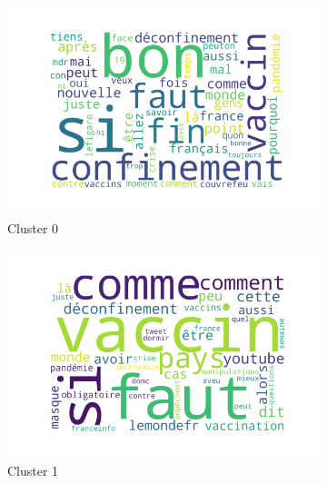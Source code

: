 \begin{figure}
    \centering
    \begin{subfigure}[b]{0.49\textwidth}
        \centering
        \includegraphics[width=\textwidth]{results/TopicDetection/fr/cluster3_0.png}
        \caption{Cluster 0}
        \label{fig:fr_c0}
    \end{subfigure}
    \hfill
    \begin{subfigure}[b]{0.49\textwidth}
        \centering
        \includegraphics[width=\textwidth]{results/TopicDetection/fr/cluster3_1.png}
        \caption{Cluster 1}
        \label{fig:fr_c1}
    \end{subfigure}
    \hfill
    \begin{subfigure}[b]{0.49\textwidth}
        \centering

\end{subfigure}
\end{figure}
